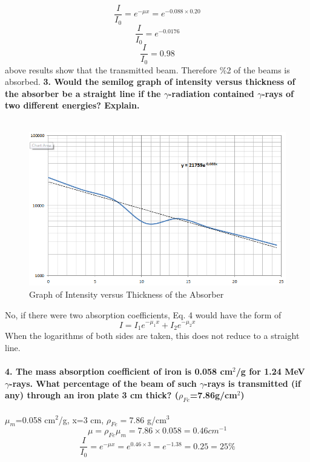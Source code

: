 \documentclass[a4paper,12pt]{article}
\begin{document}
\begin{equation}
\frac{I}{I_{0}}=e^{-\mu x}=e^{-0.088\times 0.20}
\end{equation}
\begin{equation}
\frac{I}{I_{0}}=e^{-0.0176}
\end{equation}
\begin{equation}
\frac{I}{I_{0}}=0.98
\end{equation}
above results show that the transmitted beam. Therefore \%2 of the beams is absorbed.
\newpage
\textbf{3. Would the semilog graph of intensity versus thickness of the absorber be a straight line if the $\gamma$-radiation contained $\gamma$-rays of two different energies? Explain.}\\\\
\begin{figure}[h!]
\centering
\includegraphics[scale = 0.8 ]{plot1}
\caption{Graph of Intensity versus Thickness of the Absorber }
\label{fig:plot1}
\end{figure}

No, if there were two absorption coefficients, Eq. 4 would have the form of 
\begin{equation}
I=I_{1}e^{-\mu_{1}x}+I_{2}e^{-\mu_{2}x}
\end{equation}
When the logarithms of both sides are taken, this does not reduce to a straight line.\\\\
\textbf{4. The mass absorption coefficient of iron is 0.058 cm$^{2}$/g for 1.24 MeV $\gamma$-rays. What percentage of the beam of such $\gamma$-rays is transmitted (if any) through an iron plate 3 cm thick? ($\rho_{Fe}$=7.86g/cm$^{2}$)}\\\\
$\mu_{m}$=0.058 cm$^{2}$/g, x=3 cm, $\rho_{Fe}=7.86$ g/cm$^{3}$\\
\begin{equation}
\mu=\rho_{Fe}\mu_{m}=7.86\times 0.058=0.46 cm^{-1}
\end{equation}
\begin{equation}
\frac{I}{I_{0}}=e^{-\mu x}=e^{0.46\times 3}=e^{-1.38}=0.25=25\%
\end{equation}
\end{document}
